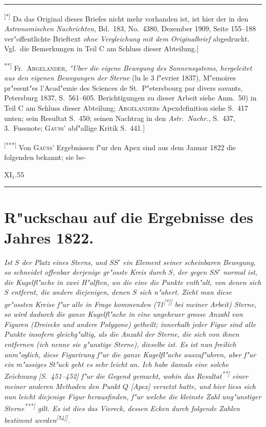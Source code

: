 \documentclass[12pt,a4paper]{article}
\theoremstyle{plain}
\theoremstyle{definition}
\theoremstyle{remark}
\begin{document}
\rule{\textwidth}{0.4pt}
{\small
\textsuperscript{[*]} Da das Original dieses Briefes nicht mehr vorhanden ist, ist hier der in den {\itshape Astronomischen Nachrichten}, Bd.\ 183, No.\ 4380, Dezember 1909, Seite 155--188 ver"offentlichte Brieftext {\itshape ohne Vergleichung mit dem Originalbrief} abgedruckt. Vgl.\ die Bemerkungen in Teil C am Schluss dieser Abteilung.]

\textsuperscript{**]} Fr.\ \textsc{Argelander}, {\itshape "Uber die eigene Bewegung des Sonnensystems, hergeleitet aus den eigenen Bewegungen der Sterne} (lu le 3 f"evrier 1837), M"emoires pr"esent"es 
 l'Acad"emie des Sciences de St.\ P"etersbourg par divers savants, Petersburg 1837, S.\ 561--605. Berichtigungen zu dieser Arbeit siehe Anm.\ 50) in Teil C am Schluss dieser Abteilung; \textsc{Argelander}s Apexdefinition siehe S.\ 417 unten; sein Resultat S.\ 450; seinen Nachtrag in den {\itshape Astr.\ Nachr.}, S.\ 437, 3.\ Fussnote; \textsc{Gauss}' abf"allige Kritik S.\ 441.]

\textsuperscript{[***]} Von \textsc{Gauss}' Ergebnissen f"ur den Apex sind aus dem Januar 1822 die folgenden bekannt; sie be-

\hfill\textsc{XI}$_1$.\hfill55
}
\rule{\textwidth}{0.4pt}


\newpage
\section*{R"uckschau auf die Ergebnisse des Jahres 1822.}

\noindent
{\itshape Ist $S$ der Platz eines Sterns, und $SS'$ ein Element seiner scheinbaren Bewegung, so schneidet offenbar derjenige gr"osste Kreis durch $S$, der gegen $SS'$ normal ist, die Kugelfl"ache in zwei H"alften, wo die eine die Punkte enth"alt, von denen sich $S$ entfernt, die andere diejenigen, denen $S$ sich n"ahert. Zieht man diese gr"ossten Kreise f"ur alle in Frage kommenden (71\textsuperscript{[*]]} bei meiner Arbeit) Sterne, so wird dadurch die ganze Kugelfl"ache in eine ungeheuer grosse Anzahl von Figuren (Dreiecke und andere Polygone) getheilt; innerhalb jeder Figur sind alle Punkte insofern gleichg"ultig, als die Anzahl der Sterne, die sich von ihnen entfernen (ich nenne sie g"unstige Sterne), dieselbe ist. Es ist nun freilich unm"oglich, diese Figurirung f"ur die ganze Kugelfl"ache auszuf"uhren, aber f"ur ein m"assiges St"uck geht es sehr leicht an. Ich habe damals eine solche Zeichnung [S.\ 451--452] f"ur die Gegend gemacht, wohin das Resultat\textsuperscript{**]} einer meiner anderen Methoden den Punkt $Q$ [Apex] versetzt hatte, und hier liess sich nun leicht diejenige Figur herausfinden, f"ur welche die kleinste Zahl ung"unstiger Sterne\textsuperscript{***]} gilt. Es ist dies das Viereck, dessen Ecken durch folgende Zahlen bestimmt werden\textsuperscript{[54]\textdagger]}.}
\end{document}
